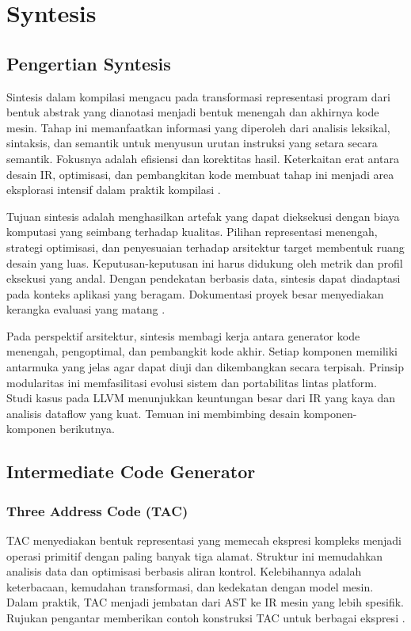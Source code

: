 \documentclass[../main.tex]{subfiles}
\begin{document}
\chapter{Syntesis}

\section{Pengertian Syntesis}
Sintesis dalam kompilasi mengacu pada transformasi representasi program dari bentuk abstrak yang dianotasi menjadi bentuk menengah dan akhirnya kode mesin. Tahap ini memanfaatkan informasi yang diperoleh dari analisis leksikal, sintaksis, dan semantik untuk menyusun urutan instruksi yang setara secara semantik. Fokusnya adalah efisiensi dan korektitas hasil. Keterkaitan erat antara desain IR, optimisasi, dan pembangkitan kode membuat tahap ini menjadi area eksplorasi intensif dalam praktik kompilasi \citep{LLVMOverview,WikiOptimization}.

Tujuan sintesis adalah menghasilkan artefak yang dapat dieksekusi dengan biaya komputasi yang seimbang terhadap kualitas. Pilihan representasi menengah, strategi optimisasi, dan penyesuaian terhadap arsitektur target membentuk ruang desain yang luas. Keputusan-keputusan ini harus didukung oleh metrik dan profil eksekusi yang andal. Dengan pendekatan berbasis data, sintesis dapat diadaptasi pada konteks aplikasi yang beragam. Dokumentasi proyek besar menyediakan kerangka evaluasi yang matang \citep{LLVMOverview}.

Pada perspektif arsitektur, sintesis membagi kerja antara generator kode menengah, pengoptimal, dan pembangkit kode akhir. Setiap komponen memiliki antarmuka yang jelas agar dapat diuji dan dikembangkan secara terpisah. Prinsip modularitas ini memfasilitasi evolusi sistem dan portabilitas lintas platform. Studi kasus pada LLVM menunjukkan keuntungan besar dari IR yang kaya dan analisis dataflow yang kuat. Temuan ini membimbing desain komponen-komponen berikutnya.

\section{Intermediate Code Generator}
\subsection{Three Address Code (TAC)}
TAC menyediakan bentuk representasi yang memecah ekspresi kompleks menjadi operasi primitif dengan paling banyak tiga alamat. Struktur ini memudahkan analisis data dan optimisasi berbasis aliran kontrol. Kelebihannya adalah keterbacaan, kemudahan transformasi, dan kedekatan dengan model mesin. Dalam praktik, TAC menjadi jembatan dari AST ke IR mesin yang lebih spesifik. Rujukan pengantar memberikan contoh konstruksi TAC untuk berbagai ekspresi \citep{WikiTAC}.
\end{document}
